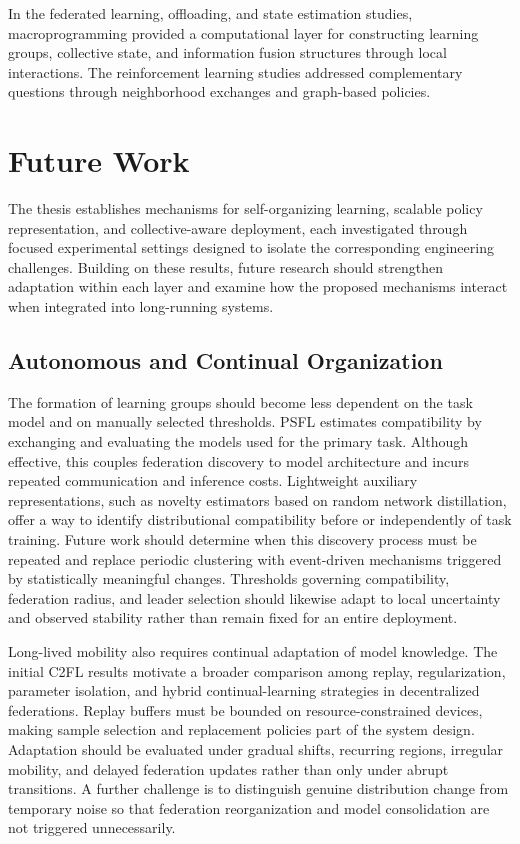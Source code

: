 In the federated learning, offloading, and state estimation studies, macroprogramming provided
 a computational layer for constructing learning groups, collective state,
 and information fusion structures through local interactions. 
% 
The reinforcement learning studies addressed
 complementary questions through neighborhood exchanges and graph-based policies.




\section{Future Work}
\label{sec:future-work}

The thesis establishes mechanisms for self-organizing learning,
 scalable policy representation, and collective-aware deployment, 
 each investigated through focused experimental settings designed to isolate 
 the corresponding engineering challenges.
%
Building on these results, 
 future research should strengthen adaptation within each layer and examine how the proposed mechanisms 
 interact when integrated into long-running systems.

\subsection{Autonomous and Continual Organization}

The formation of learning groups should become less dependent 
 on the task model and on manually selected thresholds.
%
PSFL estimates compatibility by exchanging 
 and evaluating the models used for the primary task. 
% 
Although effective, 
 this couples federation discovery to model architecture 
 and incurs repeated communication and inference costs.
%
Lightweight auxiliary representations, 
 such as novelty estimators based on random network distillation, 
 offer a way to identify distributional compatibility before or independently of task training. 
% 
Future work should determine when this discovery process must be repeated 
 and replace periodic clustering with event-driven mechanisms 
 triggered by statistically meaningful changes.
%
Thresholds governing compatibility, federation radius, 
 and leader selection should likewise adapt to local uncertainty 
 and observed stability rather than remain fixed for an entire deployment.

Long-lived mobility also requires continual adaptation of model knowledge.
%
The initial C2FL results motivate a broader comparison among replay, regularization, 
parameter isolation, and hybrid continual-learning strategies in decentralized federations. 
%
Replay buffers must be bounded on resource-constrained devices, 
 making sample selection and replacement policies part of the system design. 
% 
Adaptation should be evaluated under gradual shifts, recurring regions, irregular mobility, 
 and delayed federation updates rather than only under abrupt transitions. 
% 
A further challenge is to distinguish genuine distribution change from temporary noise 
 so that federation reorganization and model consolidation are not triggered unnecessarily.


